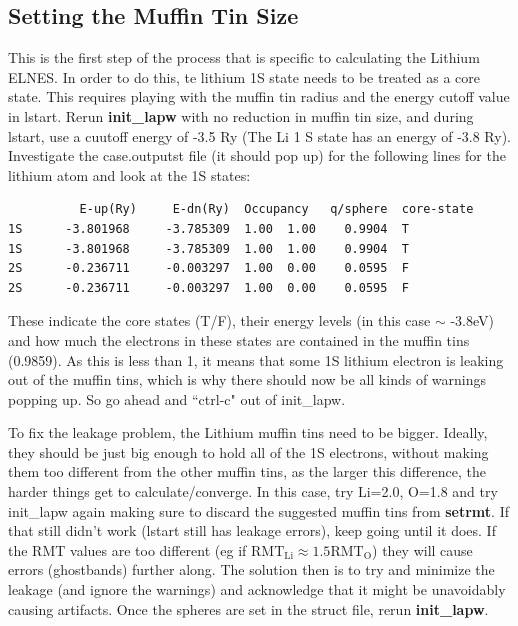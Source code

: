 \documentclass[12pt]{article}
\begin{document}
\subsection{Setting the Muffin Tin Size}
This is the first step of the process that is specific to calculating the Lithium ELNES.  In order to do this, te lithium 1S state needs to be treated as a core state.  This requires playing with the muffin tin radius and the energy cutoff value in lstart.  Rerun \textbf{init\_lapw} with no reduction in muffin tin size, and during lstart, use a cuutoff energy of -3.5 Ry (The Li 1 S state has an energy of -3.8 Ry).  Investigate the case.outputst file (it should pop up) for the following lines for the lithium atom and look at the 1S states: 


\begin{lstlisting}
          E-up(Ry)     E-dn(Ry)  Occupancy   q/sphere  core-state
1S      -3.801968     -3.785309  1.00  1.00    0.9904  T
1S      -3.801968     -3.785309  1.00  1.00    0.9904  T
2S      -0.236711     -0.003297  1.00  0.00    0.0595  F
2S      -0.236711     -0.003297  1.00  0.00    0.0595  F

\end{lstlisting}

These indicate the core states (T/F), their energy levels (in this case $\sim$ -3.8eV) and how much the electrons in these states are contained in the muffin tins (0.9859).  As this is less than 1, it means that some 1S lithium electron is leaking out of the muffin tins, which is why there should now be all kinds of warnings popping up.  So go ahead and ``ctrl-c" out of init\_lapw.


To fix the leakage problem, the Lithium muffin tins need to be bigger.   Ideally, they should be just big enough to hold all of the 1S electrons, without making them too different from the other muffin tins, as the larger this difference, the harder things get to calculate/converge.  In this case, try Li=2.0, O=1.8 and try init\_lapw again making sure to discard the suggested muffin tins from \textbf{setrmt}. If that still didn't work (lstart still has leakage errors), keep going until it does.  If the RMT values are too different (eg if $\mathrm{RMT_{Li}} \approx 1.5 \mathrm{RMT_O}$) they will cause errors  (ghostbands) further along.  The solution then is to try and minimize the leakage (and ignore the warnings) and acknowledge that it might be unavoidably causing artifacts. Once the spheres are set in the struct file, rerun \textbf{init\_lapw}.
\end{document}
